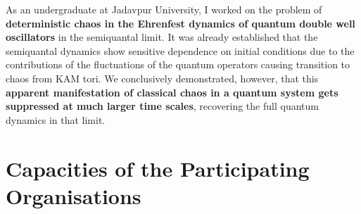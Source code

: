 \documentclass[a4paper,11pt]{article}
\begin{document}
As an undergraduate at Jadavpur University, I worked on the problem of \textbf{deterministic chaos in the Ehrenfest dynamics of quantum double well oscillators} in the semiquantal limit. It was already established that the {semiquantal dynamics} show sensitive dependence on initial conditions due to the contributions of the fluctuations of the quantum operators causing transition to chaos from KAM tori. We conclusively demonstrated, however, that this \textbf{apparent manifestation of classical chaos in a quantum system gets suppressed at much larger time scales}, recovering the full quantum dynamics in that limit. 
    
\section{Capacities of the Participating Organisations}
\label{sec:organisations}
\end{document}
